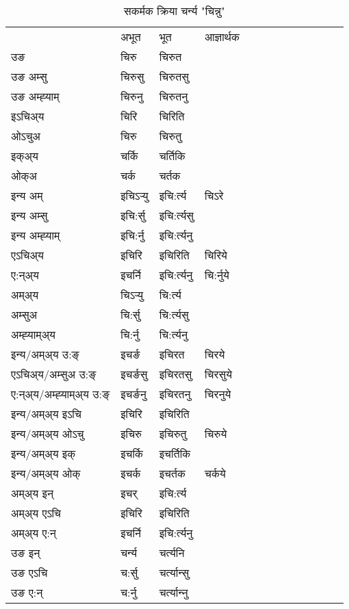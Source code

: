 \begin{table}[H]
\label{ir.vt} \centering
\caption{सकर्मक क्रिया  चर्न्य  "चिन्नु"  }
\begin{tabular}{l|l|l|l|l|l|l|l|l|l|l|l|l}  \toprule
&अभूत & भूत & आज्ञार्थक \\ 
उङ &चिरु &चिरुत \\ 
उङ अम्सु &चिरुसु &चिरुतसु \\ 
उङ अम्ह्‍याम् &चिरुनु &चिरुतनु \\ 
इऽचिअ्य &चिरि &चिरिति   \\ 
ओऽचुअ &चिरु &चिरुतु   \\ 
इक्अ्य &चर्कि &चर्तिकि   \\ 
ओक्अ &चर्क &चर्तक   \\ 
इन्य अम् & इचिऽर्‍यु  & इचि:र्त्य &चिऽरे  \\ 
इन्य अम्सु & इचि:र्सु  & इचि:र्त्यसु   \\ 
इन्य अम्ह्‍याम् & इचि:र्नु  & इचि:र्त्यनु   \\ 
एऽचिअ्य & इचिरि & इचिरिति &चिरिये    \\ 
ए:न्अ्य & इचर्नि  & इचि:र्त्यनु &चि:र्नुये  \\ 
अम्अ्य & चिऽर्‍यु  & चि:र्त्य  \\ 
अम्सुअ & चि:र्सु & चि:र्त्यसु  \\ 
अम्ह्‍याम्अ्य & चि:र्नु  & चि:र्त्यनु \\ 
\midrule
इन्य/अम्अ्य उ:ङ्‌&इचर्ङ & इचिरत &चिरये \\ 
एऽचिअ्य/अम्सुअ उ:ङ्‌ &इचर्ङसु & इचिरतसु &चिरसुये \\ 
ए:न्अ्य/अम्ह्‍याम्अ्य उ:ङ्‌ &इचर्ङनु & इचिरतनु &चिरनुये \\ 
इन्य/अम्अ्य इऽचि & इचिरि & इचिरिति    \\ 
इन्य/अम्अ्य ओऽचु & इचिरु & इचिरुतु  &चिरुये  \\ 
इन्य/अम्अ्य इक् & इचर्कि & इचर्तिकि   \\ 
इन्य/अम्अ्य ओक् & इचर्क & इचर्तक  &चर्कये  \\ 
अम्अ्य इन् & इचर् & इचि:र्त्य   \\ 
अम्अ्य एऽचि & इचिरि & इचिरिति    \\ 
अम्अ्य ए:न् & इचर्नि  & इचि:र्त्यनु  \\ 
\midrule
उङ इन् & चर्न्य  & चर्त्यनि  \\ 
उङ एऽचि & च:र्सु  & चर्त्यान्सु   \\ 
उङ ए:न्& च:र्नु  & चर्त्यान्‍नु   \\ 
\bottomrule
\end{tabular}
\end{table}


